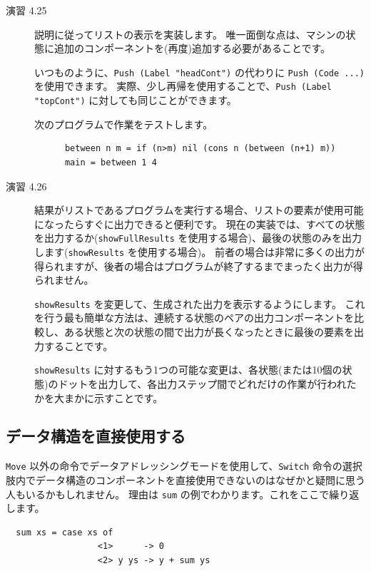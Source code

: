 \documentclass{jbook}
\begin{document}
\begin{description}
	\item[演習 4.25] 説明に従ってリストの表示を実装します。
		唯一面倒な点は、マシンの状態に追加のコンポーネントを(再度)追加する必要があることです。

		いつものように、\texttt{Push (Label "headCont")} の代わりに \texttt{Push (Code ...)} を使用できます。
		実際、少し再帰を使用することで、\texttt{Push (Label "topCont")} に対しても同じことができます。

		次のプログラムで作業をテストします。

		\begin{verbatim}
      between n m = if (n>m) nil (cons n (between (n+1) m))
      main = between 1 4
    \end{verbatim}

	\item[演習 4.26] 結果がリストであるプログラムを実行する場合、リストの要素が使用可能になったらすぐに出力できると便利です。
		現在の実装では、すべての状態を出力するか(\texttt{showFullResults} を使用する場合)、最後の状態のみを出力します(\texttt{showResults} を使用する場合)。
		前者の場合は非常に多くの出力が得られますが、後者の場合はプログラムが終了するまでまったく出力が得られません。

		\texttt{showResults} を変更して、生成された出力を表示するようにします。
		これを行う最も簡単な方法は、連続する状態のペアの出力コンポーネントを比較し、ある状態と次の状態の間で出力が長くなったときに最後の要素を出力することです。

		\texttt{showResults} に対するもう1つの可能な変更は、各状態(または10個の状態)のドットを出力して、各出力ステップ間でどれだけの作業が行われたかを大まかに示すことです。
\end{description}

\subsection{データ構造を直接使用する \dag}

\texttt{Move} 以外の命令でデータアドレッシングモードを使用して、\texttt{Switch} 命令の選択肢内でデータ構造のコンポーネントを直接使用できないのはなぜかと疑問に思う人もいるかもしれません。
理由は \texttt{sum} の例でわかります。これをここで繰り返します。

\begin{verbatim}
  sum xs = case xs of
                  <1>      -> 0
                  <2> y ys -> y + sum ys
\end{verbatim}
\end{document}
